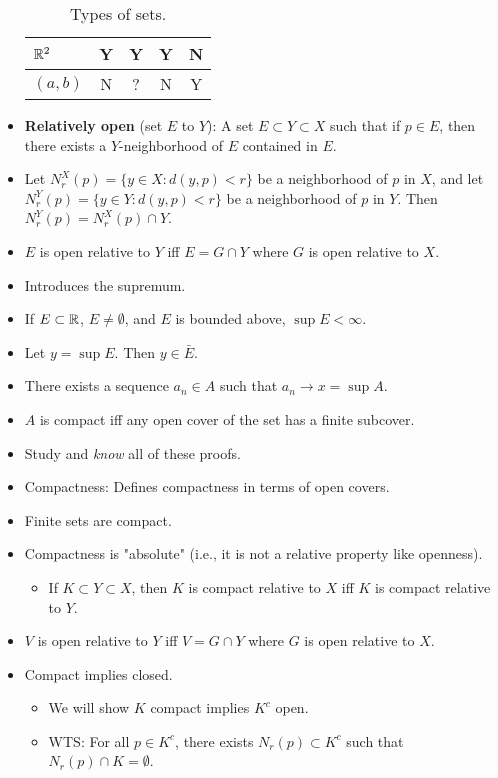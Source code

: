 \documentclass[../../notes.tex]{subfiles}
\begin{document}
\begin{itemize}
\begin{table}[h!]
\begin{tabular}{l|c|c|c|c}
            $\mathbb{R}^2$ & Y & Y & Y & N\\ \hline
            $(a,b)$ & N & ? & N & Y\\
        \end{tabular}
        \caption{Types of sets.}
        \label{tab:typesSets}
    \end{table}
    \item \textbf{Relatively open} (set $E$ to $Y$): A set $E\subset Y\subset X$ such that if $p\in E$, then there exists a $Y$-neighborhood of $E$ contained in $E$.
    \item Let $N_r^X(p)=\{y\in X:d(y,p)<r\}$ be a neighborhood of $p$ in $X$, and let $N_r^Y(p)=\{y\in Y:d(y,p)<r\}$ be a neighborhood of $p$ in $Y$. Then $N_r^Y(p)=N_r^X(p)\cap Y$.
    \item $E$ is open relative to $Y$ iff $E=G\cap Y$ where $G$ is open relative to $X$.
    \item Introduces the supremum.
    \item If $E\subset\mathbb{R}$, $E\neq\emptyset$, and $E$ is bounded above, $\sup E<\infty$.
    \item Let $y=\sup E$. Then $y\in\bar{E}$.
    \item There exists a sequence $a_n\in A$ such that $a_n\to x=\sup A$.
    \item $A$ is compact iff any open cover of the set has a finite subcover.
    \item Study and \emph{know} all of these proofs.
    \item {}Compactness: Defines compactness in terms of open covers.
    \item Finite sets are compact.
    \item Compactness is "absolute" (i.e., it is not a relative property like openness).
    \begin{itemize}
        \item If $K\subset Y\subset X$, then $K$ is compact relative to $X$ iff $K$ is compact relative to $Y$.
    \end{itemize}
    \item $V$ is open relative to $Y$ iff $V=G\cap Y$ where $G$ is open relative to $X$.
    \item Compact implies closed.
    \begin{itemize}
        \item We will show $K$ compact implies $K^c$ open.
        \item WTS: For all $p\in K^c$, there exists $N_r(p)\subset K^c$ such that $N_r(p)\cap K=\emptyset$.

\end{itemize}
\end{itemize}
\end{document}
